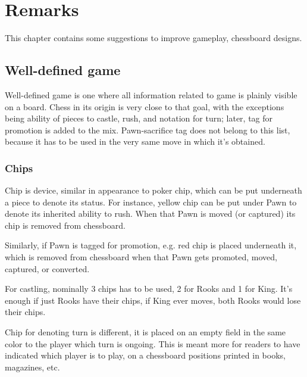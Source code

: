 

\chapter*{Remarks}
\label{ch:Remarks}

This chapter contains some suggestions to improve gameplay, chessboard
designs.

\section*{Well-defined game}
\label{sec:Remarks/Well-defined game}

Well-defined game is one where all information related to game is plainly
visible on a board. Chess in its origin is very close to that goal, with
the exceptions being ability of pieces to castle, rush, and notation for
turn; later, tag for promotion is added to the mix. Pawn-sacrifice tag
does not belong to this list, because it has to be used in the very same
move in which it's obtained.

\subsection*{Chips}
\label{sec:Remarks/Chips}

Chip is device, similar in appearance to poker chip, which can be put
underneath a piece to denote its status. For instance, yellow chip can be
put under Pawn to denote its inherited ability to rush. When that Pawn is
moved (or captured) its chip is removed from chessboard.

Similarly, if Pawn is tagged for promotion, e.g. red chip is placed
underneath it, which is removed from chessboard when that Pawn gets promoted,
moved, captured, or converted.

For castling, nominally 3 chips has to be used, 2 for Rooks and 1 for King.
It's enough if just Rooks have their chips, if King ever moves, both Rooks
would lose their chips.

Chip for denoting turn is different, it is placed on an empty field in the
same color to the player which turn is ongoing. This is meant more for
readers to have indicated which player is to play, on a chessboard positions
printed in books, magazines, etc.

